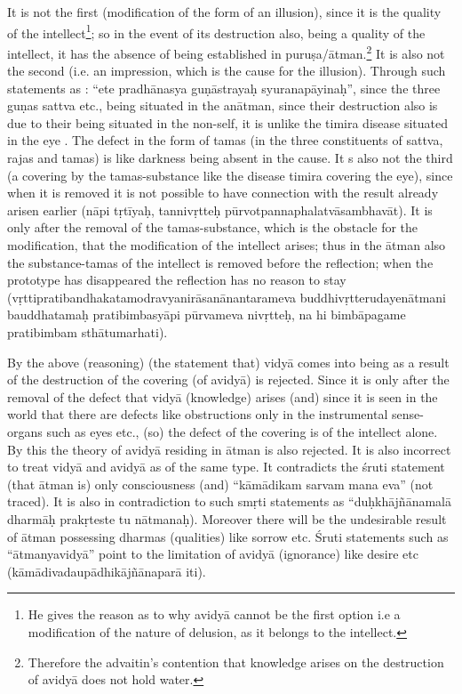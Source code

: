It is not the first (modification of the form of an illusion), since it is the quality of the intellect\footnote{He gives the reason as to why avidyā cannot be the first option i.e a modification of the nature of delusion, as it belongs to the intellect.}; so in the event of its destruction also, being a quality of the intellect, it has the absence of being established in puruṣa/ātman.\footnote{Therefore the advaitin’s contention that knowledge arises on the destruction of avidyā does not hold water.} It is also not the second (i.e. an impression,   which is the cause for the illusion). Through such statements as : “ete pradhānasya guṇāstrayaḥ syuranapāyinaḥ”, since the three guṇas sattva etc.,  being situated in the anātman, since their destruction  also is due to  their being situated in the non-self, it is unlike the timira disease situated in the eye . The defect in the form of tamas (in the three constituents of sattva, rajas and tamas) is like darkness being absent in the cause. It s also not the third (a covering by the tamas-substance like the disease timira covering the eye), since when it is removed it is not possible to have connection with the result already arisen earlier (nāpi tṛtīyaḥ, tannivṛtteḥ pūrvotpannaphalatvāsambhavāt). It is only after the removal of the tamas-substance, which is the obstacle for the modification, that the modification of the intellect arises; thus in the ātman also the substance-tamas of the intellect is removed before the reflection; when the prototype has disappeared the reflection has no reason to stay (vṛttipratibandhakatamodravyanirāsanānantarameva buddhivṛtterudayenātmani bauddhatamaḥ pratibimba\-syāpi pūrvameva nivṛtteḥ, na hi bimbāpagame pratibimbam sthātumarhati).  

By the above (reasoning) (the statement that) vidyā comes into being as a result of the destruction of the covering (of avidyā) is rejected. Since it is only after the removal of the defect that vidyā (knowledge) arises (and) since it is seen in the world that there are defects like obstructions only in the instrumental sense-organs such as eyes etc., (so) the defect of the covering is of the intellect alone. By this the theory of avidyā residing in ātman is also rejected. It is also incorrect to treat vidyā and avidyā as of the same type. It contradicts the śruti statement (that ātman is) only consciousness (and) “kāmādikam sarvam mana eva” (not traced). It is also in contradiction to such smṛti statements as “duḥkhājñānamalā dharmāḥ prakṛteste tu nātmanaḥ). Moreover there will be the undesirable result of ātman possessing dharmas (qualities) like sorrow etc. Śruti statements such as “ātmanyavidyā” point to the limitation of avidyā (ignorance) like desire etc (kāmādivadaupādhikājñānaparā iti).

